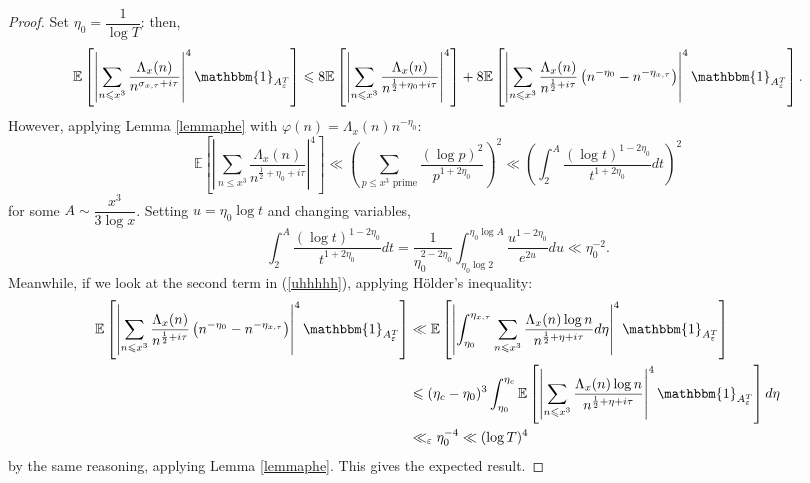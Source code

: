 \documentclass{article}
\newcommand{\phe}{\varphi}
\newcommand{\1}{\mathds{1}}
\numberwithin{equation}{section}
\newcommand{\eps}{\varepsilon}
\renewcommand{\leq}{\leqslant}
\newcommand{\E}{\mathbb{E}}
\theoremstyle{plain} %
\newcommand{\hf}{\frac{1}{2}}
\begin{document}
\begin{proof}

Set $\eta_0 = \dfrac{1}{\log T}$: then,
\begin{equation}
\label{uhhhhh}
    \E \left[ \left| \sum_{n \leq x^3} \frac{\Lambda_x(n)}{n^{\sigma_{x, \tau} + i\tau}} \right|^4\mathbbm{1}_{A_\eps^T}\right] \leq 8\E \left[ \left| \sum_{n \leq x^3} \frac{\Lambda_x(n)}{n^{\hf + \eta_0 + i\tau}} \right|^4\right] + 8\E \left[ \left| \sum_{n \leq x^3} \frac{\Lambda_x(n)}{n^{\hf + i\tau}} \left(n^{-\eta_0} - n^{-\eta_{x, \tau}} \right) \right|^4\mathbbm{1}_{A_\eps^T}\right].
\end{equation}
However, applying Lemma \ref{lemmaphe} with $\phe(n) = \Lambda_x(n) n^{-\eta_0}$:
\begin{equation}
    \E \left[ \left| \sum_{n \leq x^3} \frac{\Lambda_x(n)}{n^{\hf + \eta_0 + i\tau}} \right|^4\right]  \ll \left( \sum_{p \leq x^3 \text{ prime}} \frac{(\log p)^2}{p^{1 + 2\eta_0}} \right)^2
     \ll \left(\int_2^{A} \frac{(\log t)^{1-2 \eta_0}}{t^{1 + 2 \eta_0}} dt \right)^2
\end{equation}
for some $A \sim \dfrac{x^3}{3 \log x}$. Setting $u = \eta_0 \log t$ and changing variables,
\begin{equation}
        \int_2^{A} \frac{(\log t)^{1-2 \eta_0}}{t^{1 + 2 \eta_0}} dt  = \dfrac{1}{\eta_0^{2-2\eta_0}} \int_{\eta_0 \log 2}^{\eta_0 \log A} \frac{u^{1-2\eta_0}}{e^{2u}}du
 \ll \eta_0^{-2}.
\end{equation}
 Meanwhile, if we look at the second term in (\ref{uhhhhh}), applying Hölder's inequality:
\begin{equation*}
    \begin{split}
         \E \left[ \left| \sum_{n \leq x^3} \frac{\Lambda_x(n)}{n^{\hf + i\tau}} \left(n^{-\eta_0} - n^{-\eta_{x, \tau}} \right) \right|^4\mathbbm{1}_{A_\eps^T}\right] 
         & \ll \E \left[ \left| \int_{\eta_0}^{\eta_{x, \tau}} \sum_{n \leq x^3} \frac{\Lambda_x(n) \log n}{n^{\hf + \eta + i\tau}} d \eta \right|^4\mathbbm{1}_{A_\eps^T}\right] \\
         & \leq (\eta_c - \eta_0)^3 \int_{\eta_0}^{\eta_c}  \E \left[ \left| \sum_{n \leq x^3} \frac{\Lambda_x(n) \log n}{n^{\hf + \eta + i\tau}} \right|^4 \mathbbm{1}_{A_\eps^T} \right] d \eta \\
         & \ll_\eps \eta_0^{-4} \ll (\log T)^{4}
    \end{split}
\end{equation*}
by the same reasoning, applying Lemma \ref{lemmaphe}. This gives the expected result.
\end{proof}
\end{document}
